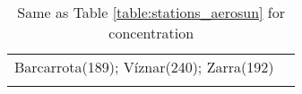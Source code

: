 \documentclass[journal abbreviation, manuscript]{copernicus}
\begin{document}
\begin{table}
\begin{tabularx}{\textwidth}{lX}
                                                                                                                                                                                                                                                                                                                                                                                                                                                                                                                                                                                                                                                                                                                                                                                                                                                                                                                                                                                                                                                                                                                                                                                                                                                                                                                                                                                                                                                                                                                                                                                                                                                                                                                                                                                                                                                                                                                                                                                                                                                                                                                                                              Barcarrota(189); Víznar(240); Zarra(192) \\
\bottomhline
 \end{tabularx}
 \caption{Same as Table \ref{table:stations_aerosun} for  concentration}
 \label{table:stations_so4}
\end{table}

\clearpage
\end{document}
